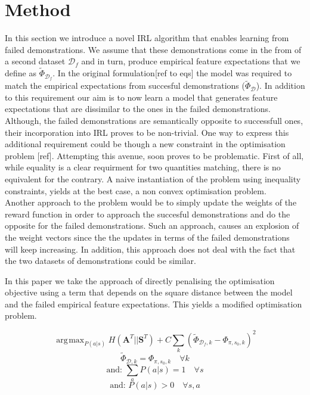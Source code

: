 \documentclass[letterpaper]{article}
\DeclareMathOperator*{\argmax}{\arg\!\max}
\begin{document}
\section{Method}
	In this section we introduce a novel IRL algorithm that enables learning from failed demonstrations. We assume that these demonstrations come in the from of a second dataset $\mathcal{D}_f$ and in turn, produce empirical feature expectations that we define as $\widetilde{\Phi}_{\mathcal{D}_f}$. 
	In the original formulation[ref to eqs] the model was required to match the empirical expectations from succesful demonstrations ($\widetilde{\Phi}_{\mathcal{D}}$). In addition to this requirement 
	our aim is to now learn a model that generates feature expectations that are dissimilar to the ones in the failed demonstrations.  
	Although, the failed demonstrations are semantically opposite to successfull ones, their incorporation into IRL proves to be non-trivial.
	One way to express this additional requirement could be though a new constraint in the optimisation problem [ref]. Attempting this avenue, soon proves to be problematic. First of all, while equality is a clear requirment for two quantities matching, there is no equivalent for the contrary. A naive instantiation of the problem using inequality constraints, yields at the best case, a non convex optimisation problem.\\
	Another approach to the problem would be to simply update the weights of the reward function in order to approach the succesful demonstrations and do the opposite for the failed demonstrations. Such an approach, causes an explosion of the weight vectors since the the updates in terms of the failed demonstrations will keep increasing. In addition, this approach does not deal with the fact that the two datasets of demonstrations could be similar. 

	In this paper we take the approach of directly penalising the optimisation objective using a term that depends on the square distance between the model and the failed empirical feature expectations. 
	This yields a modified optimisation problem. 



\begin{equation}
	\argmax_{P(a|s)} H(\mathbf{A}^T||\mathbf{S}^T) + 	C\sum_k(\widetilde{\Phi}_{\mathcal{D}_f,k}-\Phi_{\pi,s_0,k})^2
\end{equation}
\begin{equation}
	\widetilde{\Phi}_{\mathcal{D},k}   = \Phi_{\pi,s_0,k} \quad \forall k \label{eq:good_ineq}
\end{equation}
\begin{equation}
	\text{and:   }\sum_aP(a|s)  = 1 \quad \forall s  
\end{equation}
\begin{equation}
	\text{and:   }P(a|s)  > 0 \quad \forall s,a  
\end{equation}
\end{document}
